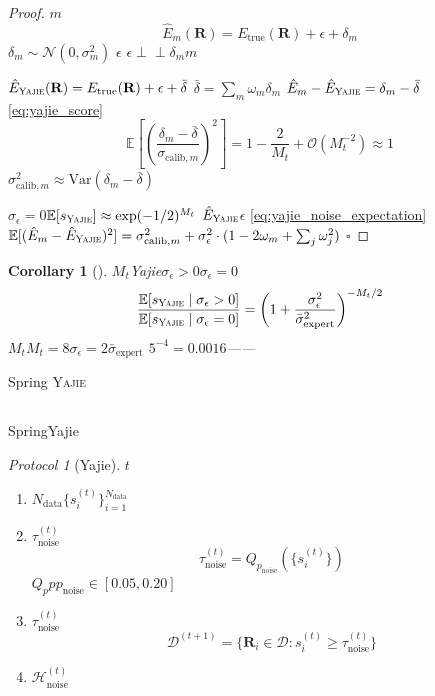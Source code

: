 \documentclass[12pt,a4paper]{article}
\newtheorem{corollary}[theorem]{Corollary}
\theoremstyle{remark}
\newtheorem{protocol}[theorem]{Protocol}
\newcommand{\E}{\mathbb{E}}
\newcommand{\Var}{\mathrm{Var}}
\newcommand{\indep}{\perp\!\!\!\perp}
\newcommand{\D}{\mathcal{D}}
\newcommand{\Yajie}{\textsc{Yajie}}
\begin{document}
\begin{proof}
$m$
\[
\hat{E}_m(\mathbf{R}) = E_{\text{true}}(\mathbf{R}) + \epsilon + \delta_m
\]
$\delta_m \sim \mathcal{N}(0, \sigma_m^2)$
$\epsilon$
$\epsilon \indep \delta_m$$m$

$\hat{E}_{\Yajie}(\mathbf{R}) = E_{\text{true}}(\mathbf{R}) + \epsilon + \bar{\delta}$
$\bar{\delta} = \sum_m \omega_m \delta_m$
$\hat{E}_m - \hat{E}_{\Yajie} = \delta_m - \bar{\delta}$
\eqref{eq:yajie_score}
\[
\E\left[\left(\frac{\delta_m - \bar{\delta}}{\sigma_{\text{calib}, m}}\right)^2\right]
= 1 - \frac{2}{M_t} + \mathcal{O}(M_t^{-2}) \approx 1
\]
$ \sigma_{\text{calib}, m}^2 \approx \Var(\delta_m - \bar{\delta})$

$\sigma_\epsilon = 0$$\E[s_{\Yajie}] \approx \exp(-1/2)^{M_t}$
$\hat{E}_{\Yajie}$$\epsilon$
\eqref{eq:yajie_noise_expectation}
$\E[(\hat{E}_m - \hat{E}_{\Yajie})^2] = \sigma_{\text{calib}, m}^2 + \sigma_\epsilon^2 \cdot (1 - 2\omega_m + \sum_j \omega_j^2)$
\hfill $\square$
\end{proof}

\begin{corollary}[]\label{cor:noise_advantage}
$M_t$Yajie$\sigma_\epsilon > 0$$\sigma_\epsilon = 0$
\begin{equation}
    \frac{\E[s_{\Yajie} \mid \sigma_\epsilon > 0]}{\E[s_{\Yajie} \mid \sigma_\epsilon = 0]} = \left(1 + \frac{\sigma_\epsilon^2}{\bar{\sigma}_{\text{expert}}^2}\right)^{-M_t/2}
\end{equation}
$M_t$$M_t = 8$$\sigma_\epsilon = 2\bar{\sigma}_{\text{expert}}$
$5^{-4} = 0.0016$——
\end{corollary}

Spring
\Yajie{}


\subsection{}

SpringYajie

\begin{protocol}[Yajie]\label{prot:noise_removal}
$t$
\begin{enumerate}[label= \arabic*,leftmargin=*,itemsep=4pt]
    \item $N_{\text{data}}$$\{s_i^{(t)}\}_{i=1}^{N_{\text{data}}}$
    \item $\tau_{\text{noise}}^{(t)}$
    \begin{equation}
        \tau_{\text{noise}}^{(t)} = Q_{p_{\text{noise}}}(\{s_i^{(t)}\})
    \end{equation}
    $Q_p$$p$$p_{\text{noise}} \in [0.05, 0.20]$
    \item $\tau_{\text{noise}}^{(t)}$
    \begin{equation}
        \D^{(t+1)} = \{\mathbf{R}_i \in \D : s_i^{(t)} \geq \tau_{\text{noise}}^{(t)}\}
    \end{equation}
    \item $\mathcal{H}_{\text{noise}}^{(t)}$
\end{enumerate}
\end{protocol}
\end{document}

